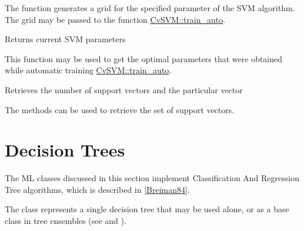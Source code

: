 
\begin{description}
\end{description}

The function generates a grid for the specified parameter of the SVM algorithm. The grid may be passed to the function \href{#CvSVM.3A.3Atrainauto}{CvSVM::train\_auto}.



Returns current SVM parameters


This function may be used to get the optimal parameters that were obtained while automatic training \href{#CvSVM.3A.3Atrainauto}{CvSVM::train\_auto}.



Retrieves the number of support vectors and the particular vector


The methods can be used to retrieve the set of support vectors.

\section{Decision Trees}


The ML classes discussed in this section implement Classification And Regression Tree algorithms, which is described in \href{#paper_Breiman84}{[Breiman84]}.

The class  represents a single decision tree that may be used alone, or as a base class in tree ensembles (see  and ).

